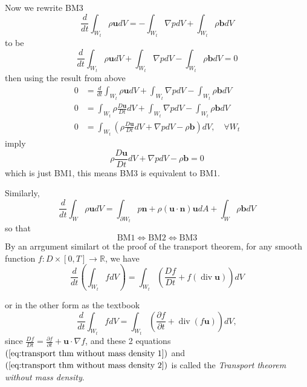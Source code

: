 Now we rewrite BM3
\begin{equation}
\frac{d}{dt} \int_{W_t} \rho \textbf{u} dV = -\int_{W_t} \nabla pdV + \int_{W_t} \rho \textbf{b}dV
\end{equation}
to be
\begin{equation}
\frac{d}{dt} \int_{W_t} \rho \textbf{u} dV + \int_{W_t} \nabla pdV - \int_{W_t} \rho \textbf{b}dV = 0
\end{equation}
then using the result from above
\begin{equation}
\begin{aligned}
0 &= \frac{d}{dt} \int_{W_t} \rho \textbf{u} dV + \int_{W_t} \nabla pdV - \int_{W_t} \rho \textbf{b}dV\\
0 &=\int_{W_t} \rho \frac{D\textbf{u}}{Dt} dV + \int_{W_t} \nabla pdV - \int_{W_t} \rho \textbf{b}dV\\
0 &= \int_{W_t} \left(\rho \frac{D\textbf{u}}{Dt} dV + \nabla pdV - \rho \textbf{b}\right)dV,\quad \forall W_t
\end{aligned}
\end{equation}
imply 
\begin{equation}
\rho \frac{D\textbf{u}}{Dt} dV + \nabla pdV - \rho \textbf{b} = 0
\end{equation}
which is just BM1, this means BM3 is equivalent to BM1. 

Similarly, 
\begin{equation}
\frac{d}{dt}\int_{W} \rho \textbf{u} dV= \int_{\partial W_t} p\textbf{n} + \rho (\textbf{u}\cdot \textbf{n})\textbf{u} dA + \int_{W}\rho \textbf{b} dV
\end{equation}
 so that 
\begin{equation}
\text{BM1} \Leftrightarrow \text{BM2} \Leftrightarrow \text{BM3}
\end{equation}
By an arrgument similart ot the proof of the transport theorem, for any smooth function $f:D\times [0,T] \to \mathbb{R}$, we have
\begin{equation}
\frac{d}{dt}\left(\int_{W_t} fdV\right)
= \int_{W_t} \left(\frac{Df}{Dt} + f(\operatorname{div}\textbf{u})\right) dV
\label{eq:transport thm without mass density 1}
\end{equation}


or in the other form as the textbook
\begin{equation}
\frac{d}{dt}\int_{W_t} f dV = \int_{W_t} \left(\frac{\partial f}{\partial t} + \operatorname{div}(f\textbf{u})\right)dV,
\label{eq:transport thm without mass density 2}
\end{equation}
since $\displaystyle\frac{Df}{Dt} = \frac{\partial f}{\partial t} + \textbf{u}\cdot \nabla f$, and these 2 equations $(\ref{eq:transport thm without mass density 1})$ and $(\ref{eq:transport thm without mass density 2})$ is called the \textit{Transport theorem without mass density}.

